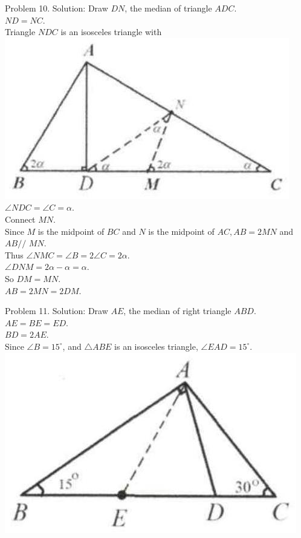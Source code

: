 \documentclass[10pt]{article}
\begin{document}
Problem 10. Solution:
Draw \(D N\), the median of triangle \(A D C\).\\
\(N D=N C\).\\
Triangle \(N D C\) is an isosceles triangle with\\
\includegraphics[max width=\textwidth]{2025_04_17_97bc1f7e44d93c271a88g-021(1)} \(\angle N D C=\angle C=\alpha\).\\
Connect \(M N\).\\
Since \(M\) is the midpoint of \(B C\) and \(N\) is the midpoint of \(A C, A B=2 M N\) and \(A B / /\) \(M N\).\\
Thus \(\angle N M C=\angle B=2 \angle C=2 \alpha\).\\
\(\angle D N M=2 \alpha-\alpha=\alpha\).\\
So \(D M=M N\).\\
\(A B=2 M N=2 D M\).

Problem 11. Solution:
Draw \(A E\), the median of right triangle \(A B D\).\\
\(A E=B E=E D\).\\
\(B D=2 A E\).\\
Since \(\angle B=15^{\circ}\), and \(\triangle A B E\) is an isosceles triangle, \(\angle E A D=15^{\circ}\).\\
\includegraphics[max width=\textwidth, center]{2025_04_17_97bc1f7e44d93c271a88g-021}
\end{document}
